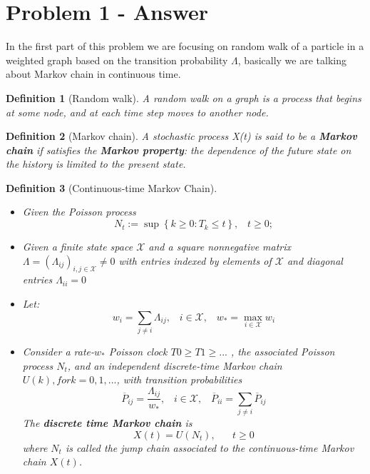 \documentclass[
	12pt, %
]{fphw}
\newtheorem{definition}{Definition}
\begin{document}
\section*{Problem 1 - Answer}
In the first part of this problem we are focusing on random walk of a particle in a weighted graph based on the transition probability $\Lambda$, basically we are talking about Markov chain in continuous time.
\begin{definition}[Random walk]
A random walk on a graph is a process that begins at some node, and at each time step moves to another node.
\end{definition}
\begin{definition}[Markov chain]
A stochastic process X(t) is said to be a \textbf{Markov chain} if satisfies the \textbf{Markov property}: the dependence of the future state on the history is limited to the present state.
\end{definition}
\begin{definition}[Continuous-time Markov Chain] \hspace{50pt}
\begin{itemize}
    \item[-] Given the Poisson process 
    \begin{equation}
        N_t := \sup{\left\{k \geq 0 : T_k \leq t\right\}}, \hspace{10pt} t \geq 0;
    \end{equation}
    \item[-] Given a finite state space $\mathcal{X}$ and a square nonnegative matrix $ \Lambda = (\Lambda_{ij})_{i,j \in \mathcal{X}} \neq 0$ with entries indexed by elements of $\mathcal{X}$ and diagonal entries $\Lambda_{ii} = 0$
    \item[-] Let:
    \begin{equation}
         w_i = \sum_{j\neq i}{\Lambda_{ij}}, \hspace{10pt} i \in \mathcal{X}, \hspace{10pt} w_{*} = \max_{i \in \mathcal{X}}{w_i} 
    \end{equation}
    
    \item[-] Consider a rate-$w_{*}$ Poisson clock $T0 \geq T1 \geq ...$ , the associated Poisson process $N_t$, and an independent discrete-time Markov chain $U(k), for k = 0, 1, ...$, with transition probabilities
    \begin{equation}
        \overline{P}_{ij} = \frac{\Lambda_{ij}}{w_{*}}, \hspace{10pt} i \in \mathcal{X}, \hspace{10pt}  \overline{P}_{ii} = \sum_{j\neq i}{\overline{P}_{ij}}
    \end{equation}
    The \textbf{discrete time Markov chain} is 
    \begin{equation}
        X(t) = U(N_t), \hspace{20pt} t\geq 0
    \end{equation} 
    where $N_t$ is called the jump chain associated to the continuous-time Markov chain $X(t)$.
\end{itemize}
\end{definition}
\end{document}
